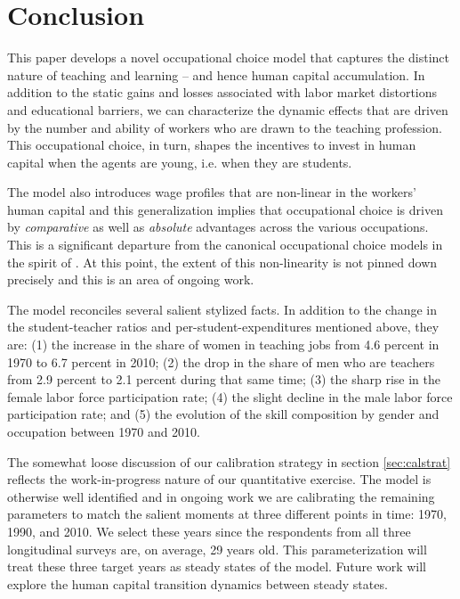 \documentclass[onehalfspacing,11pt]{article}
\begin{document}
	
	
	\newpage
	\section{Conclusion}\label{sec:conclusion}
	This paper develops a novel occupational choice model that captures the distinct nature of teaching and learning -- and hence human capital accumulation. In addition to the static gains and losses associated with labor market distortions and educational barriers, we can characterize the dynamic effects that are driven by the number and ability of workers who are drawn to the teaching profession. This occupational choice, in turn, shapes the incentives to invest in human capital when the agents are young, i.e. when they are students.
	
	The model also introduces wage profiles that are non-linear in the workers' human capital and this generalization implies that occupational choice is driven by {\it comparative} as well as {\it absolute} advantages across the various occupations. This is a significant departure from the canonical occupational choice models in the spirit of \cite{Roy:1951}. At this point, the extent of this non-linearity is not pinned down precisely and this is an area of ongoing work.
	
	The model reconciles several salient stylized facts. In addition to the change in the student-teacher ratios and per-student-expenditures mentioned above, they are: (1) the increase in the share of women in teaching jobs from 4.6 percent in 1970 to 6.7 percent in 2010; (2) the drop in the share of men who are teachers from 2.9 percent to 2.1 percent during that same time; (3) the sharp rise in the female labor force participation rate; (4) the slight decline in the male labor force participation rate; and (5) the evolution of the skill composition by gender and occupation between 1970 and 2010.
	
	The somewhat loose discussion of our calibration strategy in section \ref{sec:calstrat} reflects the work-in-progress nature of our quantitative exercise. The model is otherwise well identified and in ongoing work we are calibrating the remaining parameters to match the salient moments at three different points in time: 1970, 1990, and 2010. We select these years since the respondents from all three longitudinal surveys are, on average, 29 years old. This parameterization will treat these three target years as steady states of the model. Future work will explore the human capital transition dynamics between steady states.
	
\end{document}
